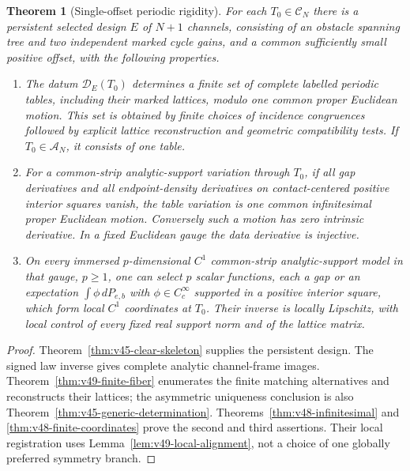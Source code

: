 \theoremstyle{plain}
\newtheorem{structuraltheorem}{Theorem}
\renewcommand{\thestructuraltheorem}{\Alph{structuraltheorem}}
\begin{structuraltheorem}[Single-offset periodic rigidity]
\label{thm:v48-main}
For each $T_0\in\mathscr C_N$ there is a persistent selected design
$E$ of $N+1$ channels, consisting of an obstacle spanning tree and two
independent marked cycle gains, and a common sufficiently small positive
offset, with the following properties.
\begin{enumerate}
\item The datum $\mathcal D_E(T_0)$ determines a finite set of complete
labelled periodic tables, including their marked lattices, modulo one
common proper Euclidean motion.  This set is obtained by finite choices
of incidence congruences followed by explicit lattice reconstruction
and geometric compatibility tests.  If $T_0\in\mathscr A_N$, it
consists of one table.
\item For a common-strip analytic-support variation through $T_0$, if
all gap derivatives and all endpoint-density derivatives on
contact-centered positive interior squares vanish, the table variation
is one common infinitesimal proper Euclidean motion.  Conversely such
a motion has zero intrinsic derivative.  In a fixed Euclidean gauge
the data derivative is injective.
\item On every immersed $p$-dimensional $C^1$ common-strip
analytic-support model in that gauge, $p\ge1$, one can select $p$
scalar functions, each a gap or an expectation
$\int\phi\,dP_{e,b}$ with $\phi\in C_c^\infty$ supported in a positive
interior square, which form local $C^1$ coordinates at $T_0$.
Their inverse is locally Lipschitz, with local control of every fixed
real support norm and of the lattice matrix.
\end{enumerate}
\end{structuraltheorem}

\begin{proof}
Theorem~\ref{thm:v45-clear-skeleton} supplies the persistent design.
The signed law inverse gives complete analytic channel-frame images.
Theorem~\ref{thm:v49-finite-fiber} enumerates the finite matching
alternatives and reconstructs their lattices; the asymmetric uniqueness
conclusion is also Theorem~\ref{thm:v45-generic-determination}.
Theorems~\ref{thm:v48-infinitesimal} and
\ref{thm:v48-finite-coordinates} prove the second and third assertions.
Their local registration uses Lemma~\ref{lem:v49-local-alignment}, not
a choice of one globally preferred symmetry branch.
\end{proof}

